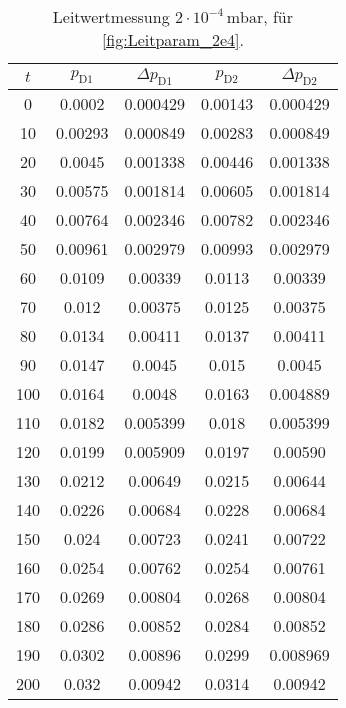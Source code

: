 \begin{table}[H]
    \centering
    \caption{Leitwertmessung $2 \cdot 10^{-4} \, \si{\milli\bar}$, für  \autoref{fig:Leitparam_2e4}.}
    \label{tab:Leitparam_2e4}
    \begin{tabular}{c c c c c}
        \toprule
        {$t$} & {$p_\text{D1}$} & {$\Delta p_\text{D1}$} & {$p_\text{D2}$} & {$\Delta p_\text{D2}$} \\
        \midrule
        0 & 0.0002 & 0.000429 & 0.00143 & 0.000429\\
        10 & 0.00293 & 0.000849 & 0.00283 & 0.000849\\
        20 & 0.0045 & 0.001338 & 0.00446 & 0.001338\\
        30 & 0.00575 & 0.001814 & 0.00605 & 0.001814\\
        40 & 0.00764 & 0.002346 & 0.00782 & 0.002346\\
        50 & 0.00961 & 0.002979 & 0.00993 & 0.002979\\
        60 & 0.0109 & 0.00339 & 0.0113 & 0.00339\\
        70 & 0.012 & 0.00375 & 0.0125 & 0.00375\\
        80 & 0.0134 & 0.00411 & 0.0137 & 0.00411\\
        90 & 0.0147 & 0.0045 & 0.015 & 0.0045\\
        100 & 0.0164 & 0.0048 & 0.0163 & 0.004889\\
        110 & 0.0182 & 0.005399 & 0.018 & 0.005399\\
        120 & 0.0199 & 0.005909 & 0.0197 & 0.00590\\
        130 & 0.0212 & 0.00649 & 0.0215 & 0.00644\\
        140 & 0.0226 & 0.00684 & 0.0228 & 0.00684\\
        150 & 0.024 & 0.00723 & 0.0241 & 0.00722\\
        160 & 0.0254 & 0.00762 & 0.0254 & 0.00761\\
        170 & 0.0269 & 0.00804 & 0.0268 & 0.00804\\
        180 & 0.0286 & 0.00852 & 0.0284 & 0.00852\\
        190 & 0.0302 & 0.00896 & 0.0299 & 0.008969\\
        200 & 0.032 & 0.00942 & 0.0314 & 0.00942\\
        \bottomrule
    \end{tabular}
\end{table}


